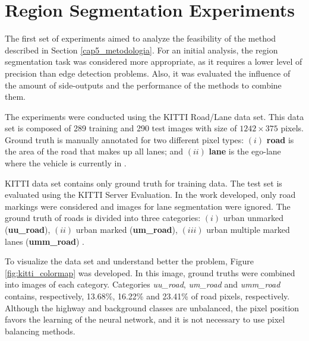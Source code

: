 \section{Region Segmentation Experiments}
\label{cap6_result_experm_1}

The first set of experiments aimed to analyze the feasibility of the method described in Section \ref{cap5_metodologia}.
For an initial analysis, the region segmentation task was considered more appropriate, as it requires a lower level of precision than edge detection problems.
Also, it was evaluated the influence of the amount of side-outputs and the performance of the methods to combine them.

The experiments were conducted using the KITTI Road/Lane data set.
This data set is composed of 289 training and 290 test images with size of $1242 \times 375$ pixels. 
Ground truth is manually annotated for two different pixel types: $(i)$ \textbf{road} is the area of the road that makes up all lanes; and $(ii)$ \textbf{lane} is the ego-lane where the vehicle is currently in \cite{Fritsch2013ITSC}.

KITTI data set contains only ground truth for training data.
The test set is evaluated using the KITTI Server Evaluation.
In the work developed, only road markings were considered and images for lane segmentation were ignored.
The ground truth of roads is divided into three categories: $(i)$ urban unmarked (\textbf{uu\_road}), $(ii)$ urban marked (\textbf{um\_road}), $(iii)$ urban multiple marked lanes (\textbf{umm\_road}) \cite{Fritsch2013ITSC}.


{\color{red}
To visualize the data set and understand better the problem, Figure \ref{fig:kitti_colormap} was developed.
In this image, ground truths were combined into images of each category. 
Categories \textit{uu\_road}, \textit{um\_road} and \textit{umm\_road} contains, respectively, 13.68\%, 16.22\% and 23.41\% of road pixels, respectively.
Although the highway and background classes are unbalanced, the pixel position favors the learning of the neural network, and it is not necessary to use pixel balancing methods.
}

